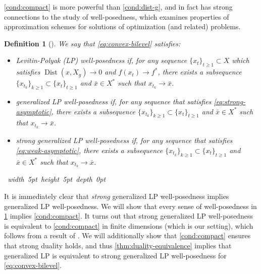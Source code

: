 \documentclass[11pt,oneside]{article}
\theoremstyle{plain}
\theoremstyle{plain}
\theoremstyle{plain}%
\newtheorem{definition}{Definition}%
\DeclareMathOperator{\Dist}{Dist}
\newcommand{\epr}{\hfill\hbox{\hskip 4pt \vrule width 5pt height 5pt depth 0pt}\vspace{0.0cm}\par}
\begin{document}
{\cref{cond:compact} is more powerful than \cref{cond:dist-g}, and in fact has strong connections to the study of well-posedness, which examines properties of approximation schemes for solutions of optimization (and related) problems. 
\begin{definition}[{\citet{HuangYang2006}}]\label{def:Levitin-Polyak-wellposed}
We say that \cref{eq:convex-bilevel} satisfies:
\begin{itemize}
    \item \emph{Levitin-Polyak (LP) well-posedness} if, for any sequence $\{x_t\}_{t \geq 1} \subset X$ which satisfies $\Dist(x,X_g) \to 0$ and $f(x_t) \to f^*$, there exists a subsequence $\{x_{t_k}\}_{k \geq 1} \subset \{x_t\}_{t \geq 1}$ and $\bar{x} \in X^*$ such that $x_{t_k} \to \bar{x}$.

    \item \emph{generalized LP well-posedness} if, for any sequence that satisfies \cref{eq:strong-asymptotic}, there exists a subsequence $\{x_{t_k}\}_{k \geq 1} \subset \{x_t\}_{t \geq 1}$ and $\bar{x} \in X^*$ such that $x_{t_k} \to \bar{x}$.

    \item \emph{strong generalized LP well-posedness} if, for any sequence that satisfies \cref{eq:weak-asymptotic}, there exists a subsequence $\{x_{t_k}\}_{k \geq 1} \subset \{x_t\}_{t \geq 1}$ and $\bar{x} \in X^*$ such that $x_{t_k} \to \bar{x}$.
\end{itemize}
\epr
\end{definition}
It is immediately clear that \emph{strong} generalized LP well-posedness implies generalized LP well-posedness. We will show that every sense of well-posedness in \cref{def:Levitin-Polyak-wellposed} implies \cref{cond:compact}.
It turns out that strong generalized LP well-posedness is equivalent to \cref{cond:compact} in finite dimensions (which is our setting), which follows from a result of \citet{HuangYang2006}. We will additionally show that \cref{cond:compact} ensures that strong duality holds, and thus \cref{thm:duality-equivalence} implies that generalized LP is equivalent to strong generalized LP well-posedness for \cref{eq:convex-bilevel}.

}
\end{document}
